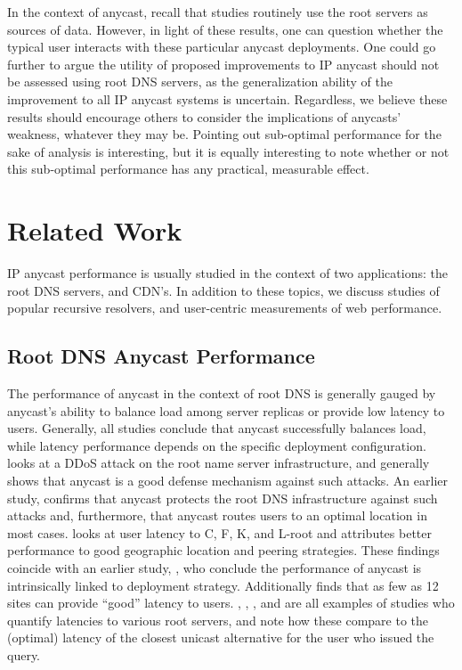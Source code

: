 \documentclass[sigconf,nonacm,10pt]{acmart}
\begin{document}
\label{sec:discussion_implications} In the context of anycast, recall
that studies routinely use the root servers as sources of data. However,
in light of these results, one can question whether the typical user
interacts with these particular anycast deployments. One could go
further to argue the utility of proposed improvements to IP anycast
should not be assessed using root DNS servers, as the generalization
ability of the improvement to all IP anycast systems is uncertain.
\break
Regardless, we believe these results should encourage others to consider
the implications of anycasts' weakness, whatever they may be. Pointing
out sub-optimal performance for the sake of analysis is interesting, but
it is equally interesting to note whether or not this sub-optimal
performance has any practical, measurable effect.

\section{Related Work}\label{related-work-1}

\label{sec:related} IP anycast performance is usually studied in the
context of two applications: the root DNS servers, and CDN's. In
addition to these topics, we discuss studies of popular recursive
resolvers, and user-centric measurements of web performance.

\subsection{Root DNS Anycast
Performance}\label{root-dns-anycast-performance}

The performance of anycast in the context of root DNS is generally
gauged by anycast's ability to balance load among server replicas or
provide low latency to users. Generally, all studies conclude that
anycast successfully balances load, while latency performance depends on
the specific deployment configuration. \cite{moura2016anycast} looks at
a DDoS attack on the root name server infrastructure, and generally
shows that anycast is a good defense mechanism against such attacks. An
earlier study, \cite{sarat2006use} confirms that anycast protects the
root DNS infrastructure against such attacks and, furthermore, that
anycast routes users to an optimal location in most cases.
\cite{de2017anycast} looks at user latency to C, F, K, and L-root and
attributes better performance to good geographic location and peering
strategies. These findings coincide with an earlier study,
\cite{ballani2006measurement}, who conclude the performance of anycast
is intrinsically linked to deployment strategy. Additionally
\cite{de2017anycast} finds that as few as 12 sites can provide ``good''
latency to users. \cite{li_levin_spring_bhattacharjee_2018},
\cite{colitti2006evaluating}, \cite{de2017anycast}, and
\cite{liang2013measuring} are all examples of studies who quantify
latencies to various root servers, and note how these compare to the
(optimal) latency of the closest unicast alternative for the user who
issued the query.
\end{document}
